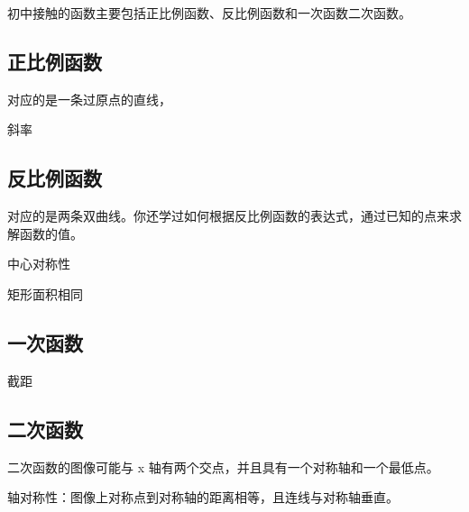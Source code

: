
\begin{issues}
\issueDraft
\end{issues}

初中接触的函数主要包括正比例函数、反比例函数和一次函数二次函数。

\subsection{正比例函数}

对应的是一条过原点的直线，

斜率


\subsection{反比例函数}

对应的是两条双曲线。你还学过如何根据反比例函数的表达式，通过已知的点来求解函数的值。

中心对称性

矩形面积相同


\subsection{一次函数}

截距

\subsection{二次函数}

二次函数的图像可能与  x  轴有两个交点，并且具有一个对称轴和一个最低点。

轴对称性：图像上对称点到对称轴的距离相等，且连线与对称轴垂直。